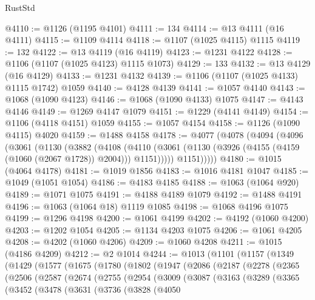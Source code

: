 \begin{lexlean}{RustStd}
\begin{coremodule}
@4110 := @1126 (@1195 @4101)
@4111 := 134
@4114 := @13 @4111 (@16 @4111)
@4115 := @1109 @4114
@4118 := @1107 (@1025 @4115) @1115
@4119 := 132
@4122 := @13 @4119 (@16 @4119)
@4123 := @1231 @4122
@4128 := @1106 (@1107 (@1025 @4123) @1115 @1073)
@4129 := 133
@4132 := @13 @4129 (@16 @4129)
@4133 := @1231 @4132
@4139 := @1106 (@1107 (@1025 @4133) @1115 @1742) @1059
@4140 := @4128 @4139
@4141 := @1057 @4140
@4143 := @1068 (@1090 @4123)
@4146 := @1068 (@1090 @4133) @1075
@4147 := @4143 @4146
@4149 := @1269 @4147 @1079
@4151 := @1229 (@4141 @4149)
@4154 := @1106 (@4118 @4151) @1059
@4155 := @1057 @4154
@4158 := @1126 (@1090 @4115) @4020
@4159 := @1488 @4158
@4178 := @4077
    (@4078
      (@4094
        (@4096
          (@3061
            (@1130
              (@3882
                (@4108
                  (@4110
                    (@3061 (@1130 (@3926 (@4155 (@4159 (@1060 (@2067 @1728)) @2004))) @1151)))))
              @1151)))))
@4180 := @1015 (@4064 @4178)
@4181 := @1019 @1856
@4183 := @1016 @4181 @1047
@4185 := @1049 (@1051 @1054)
@4186 := @4183 @4185
@4188 := @1063 (@1064 @920)
@4189 := @1071 @1075
@4191 := @4188 @4189 @1079
@4192 := @1488 @4191
@4196 := @1063 (@1064 @18) @1119 @1085
@4198 := @1068 @4196 @1075
@4199 := @1296 @4198
@4200 := @1061 @4199
@4202 := @4192 (@1060 @4200)
@4203 := @1202 @1054
@4205 := @1134 @4203 @1075
@4206 := @1061 @4205
@4208 := @4202 (@1060 @4206)
@4209 := @1060 @4208
@4211 := @1015 (@4186 @4209)
@4212 := @2 @1014
@4244 := @1013
    (@1101
      (@1157
        (@1349
          (@1429
            (@1577
              (@1675
                (@1780
                  (@1802
                    (@1947
                      (@2086
                        (@2187
                          (@2278
                            (@2365
                              (@2506
                                (@2587
                                  (@2674
                                    (@2755
                                      (@2954
                                        (@3009
                                          (@3087
                                            (@3163
                                              (@3289
                                                (@3365
                                                  (@3452
                                                    (@3478
                                                      (@3631
                                                        (@3736
                                                          (@3828
                                                            (@4050

\end{coremodule}
\end{lexlean}
